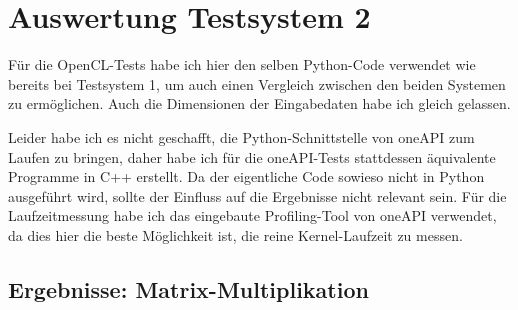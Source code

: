 \documentclass[12pt]{article}
\begin{document}
	\section*{Auswertung Testsystem 2}
	Für die OpenCL-Tests habe ich hier den selben Python-Code verwendet wie bereits bei Testsystem 1, um auch einen Vergleich zwischen den beiden Systemen zu ermöglichen.
	Auch die Dimensionen der Eingabedaten habe ich gleich gelassen.
	
	Leider habe ich es nicht geschafft, die Python-Schnittstelle von oneAPI zum Laufen zu bringen, daher habe ich für die oneAPI-Tests stattdessen äquivalente Programme in C++ erstellt.
	Da der eigentliche Code sowieso nicht in Python ausgeführt wird, sollte der Einfluss auf die Ergebnisse nicht relevant sein.
	Für die Laufzeitmessung habe ich das eingebaute Profiling-Tool von oneAPI verwendet, da dies hier die beste Möglichkeit ist, die reine Kernel-Laufzeit zu messen.
	
	\subsection*{Ergebnisse: Matrix-Multiplikation}
\end{document}
